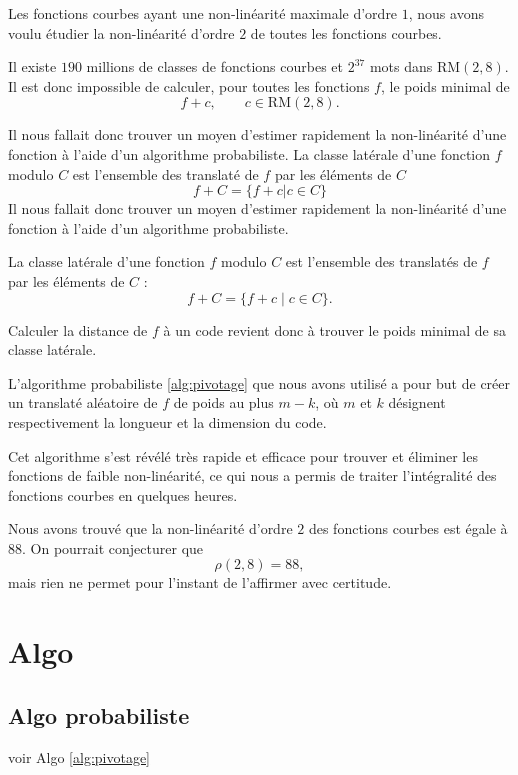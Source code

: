 \documentclass{article}
\def\RM#1#2{\ensuremath{\mathrm{RM}(#1, #2)}}
\begin{document}
Les fonctions courbes ayant une non-linéarité maximale d’ordre \(1\), nous avons voulu étudier la non-linéarité d’ordre \(2\) de toutes les fonctions courbes.

Il existe \(190\) millions de classes de fonctions courbes et \(2^{37}\) mots dans \(\RM{2}{8}\). Il est donc impossible de calculer, pour toutes les fonctions \(f\), le poids minimal de
\[
f + c, \qquad c \in \RM{2}{8}.
\]

Il nous fallait donc trouver un moyen d’estimer rapidement la non-linéarité d’une fonction à l’aide d’un algorithme probabiliste.
La classe latérale d'une fonction $f$ modulo $C$ est l'ensemble des translaté de $f$ par les éléments de $C$
$$ f + C = \{f + c | c \in C\}
$$
Il nous fallait donc trouver un moyen d’estimer rapidement la non-linéarité d’une fonction à l’aide d’un algorithme probabiliste.

La classe latérale d’une fonction \(f\) modulo \(C\) est l’ensemble des translatés de \(f\) par les éléments de \(C\) :
\[
f + C = \{f + c \mid c \in C\}.
\]

Calculer la distance de \(f\) à un code revient donc à trouver le poids minimal de sa classe latérale.

L’algorithme probabiliste \ref{alg:pivotage} que nous avons utilisé a pour but de créer un translaté aléatoire de \(f\) de poids au plus \(m-k\), où \(m\) et \(k\) désignent respectivement la longueur et la dimension du code.

Cet algorithme s’est révélé très rapide et efficace pour trouver et éliminer les fonctions de faible non-linéarité, ce qui nous a permis de traiter l’intégralité des fonctions courbes en quelques heures.

Nous avons trouvé que la non-linéarité d’ordre \(2\) des fonctions courbes est égale à \(88\). On pourrait conjecturer que
\[
\rho(2,8)=88,
\]
mais rien ne permet pour l’instant de l’affirmer avec certitude.



\section{Algo}
\subsection{Algo probabiliste}
voir Algo \ref{alg:pivotage}
\end{document}
